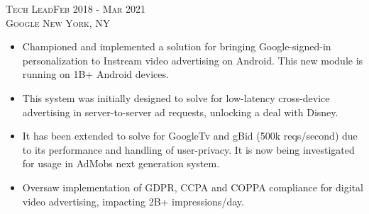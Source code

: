   
\textsc{Tech Lead\hfill Feb 2018 - Mar 2021\\}
\textsc{Google \hfill New York, NY\\}
\begin{itemize}
	\setlength{\itemsep}{1pt}
	\setlength{\parskip}{0pt}
	\setlength{\parsep}{0pt}
	\setlength{\leftmargin}{-5mm}
  \item Championed and implemented a solution for bringing Google-signed-in personalization to Instream video advertising on Android. This new module is running on 1B+ Android devices.

  \item This system was initially designed to solve for low-latency cross-device advertising in server-to-server ad requests, unlocking a deal with Disney.
 
  \item It has been extended to solve for GoogleTv and gBid (500k reqs/second) due to its performance and handling of user-privacy. It is now being investigated for usage in AdMobs next generation system. 
  
  \item Oversaw implementation of GDPR, CCPA and COPPA compliance for digital video advertising, impacting 2B+ impressions/day.






\end{itemize}

